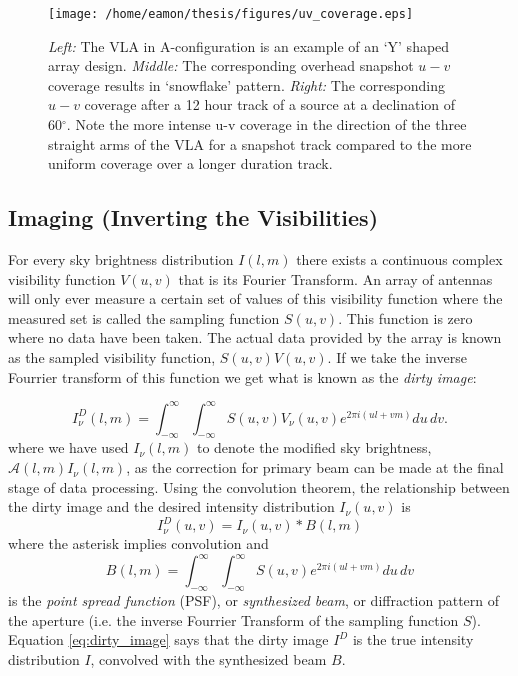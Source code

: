 \begin{figure}[hbt!]
\centering 
          \texttt{[image: /home/eamon/thesis/figures/uv\_coverage.eps]}
\caption[VLA antenna layout and two examples of $u-v$ coverage for different track lengths.]{\textit{Left:} The VLA in A-configuration is an example of an `Y' shaped array design. \textit{Middle:} The corresponding overhead snapshot $u-v$ coverage results in `snowflake' pattern. \textit{Right:} The corresponding $u-v$ coverage after a 12 hour track of a source at a declination of 60$^{\circ}$. Note the more intense u-v coverage in the direction of the three straight arms of the VLA for a snapshot track compared to the more uniform coverage over a longer duration track.}
\label{fig2i}
\end{figure}

\subsection{Imaging (Inverting the Visibilities)}\label{subsec:4.2}
For every sky brightness distribution $I(l,m)$ there exists a continuous complex visibility function $V(u,v)$ that is its Fourier Transform. An array of antennas will only ever measure a certain set of values of this visibility function where the measured set is called the sampling function $S(u,v)$. This function is zero where no data have been taken. The actual data provided by the array is known as the sampled visibility function, $S(u,v)V(u,v)$. If we take the inverse Fourrier transform of this function we get what is known as the \textit{dirty image}:

\begin{equation}\label{eq:dirtyim}
I_{\nu}^{D}(l,m)=\int ^{\infty}_{-\infty}\int ^{\infty}_{-\infty}S(u,v)V_{\nu}(u,v)\mathit{e}^{2\pi \mathit{i}(ul+vm)}du\,dv.
\end{equation}
where we have used $I_{\nu}(l,m)$ to denote the modified sky brightness, $\mathcal{A}(l,m)I_{\nu}(l,m)$, as the correction for primary beam can be made at the final stage of data processing. Using the convolution theorem, the relationship between the dirty image and the desired intensity distribution $I_{\nu}(u,v)$ is
\begin{equation}\label{eq:dirty_image}
I_{\nu}^{D}(u,v)=I_{\nu}(u,v)*B(l,m)
\end{equation}
where the asterisk implies convolution and
\begin{equation}\label{beam_samp}
B(l,m) = \int ^{\infty}_{-\infty}\int ^{\infty}_{-\infty}S(u,v)\mathit{e}^{2\pi \mathit{i}(ul+vm)}du\,dv
\end{equation}
is the \textit{point spread function} (PSF), or \textit{synthesized beam}, or diffraction pattern of the aperture (i.e. the inverse Fourrier Transform of the sampling function $S$). Equation \ref{eq:dirty_image} says that the dirty image $I^{D}$ is the true intensity distribution $I$, convolved with the synthesized beam $B$.

